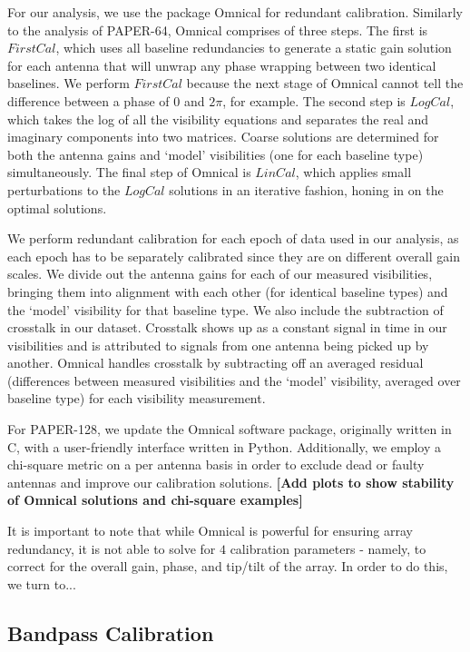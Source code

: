 \documentclass[preprint2,numberedappendix,tighten,twocolappendix]{aastex6}  %
\newcommand{\cc}[1]{{\color{purple} \textbf{[#1]}}}
\begin{document}
For our analysis, we use the package Omnical for redundant calibration. Similarly to the analysis of PAPER-64, Omnical comprises of three steps. The first is $FirstCal$, which uses all baseline redundancies to generate a static gain solution for each antenna that will unwrap any phase wrapping between two identical baselines. We perform $FirstCal$ because the next stage of Omnical cannot tell the difference between a phase of $0$ and $2\pi$, for example. The second step is $LogCal$, which takes the log of all the visibility equations and separates the real and imaginary components into two matrices. Coarse solutions are determined for both the antenna gains and `model' visibilities (one for each baseline type) simultaneously. The final step of Omnical is $LinCal$, which applies small perturbations to the $LogCal$ solutions in an iterative fashion, honing in on the optimal solutions.

We perform redundant calibration for each epoch of data used in our analysis, as each epoch has to be separately calibrated since they are on different overall gain scales. We divide out the antenna gains for each of our measured visibilities, bringing them into alignment with each other (for identical baseline types) and the `model' visibility for that baseline type. We also include the subtraction of crosstalk in our dataset. Crosstalk shows up as a constant signal in time in our visibilities and is attributed to signals from one antenna being picked up by another. Omnical handles crosstalk by subtracting off an averaged residual (differences between measured visibilities and the `model' visibility, averaged over baseline type) for each visibility measurement.

For PAPER-128, we update the Omnical software package, originally written in C, with a user-friendly interface written in Python.  Additionally, we employ a chi-square metric on a per antenna basis in order to exclude dead or faulty antennas and improve our calibration solutions. \cc{Add plots to show stability of Omnical solutions and chi-square examples}
 
It is important to note that while Omnical is powerful for ensuring array redundancy, it is not able to solve for $4$ calibration parameters - namely, to correct for the overall gain, phase, and tip/tilt of the array. In order to do this, we turn to...

\subsection{Bandpass Calibration}
\end{document}
